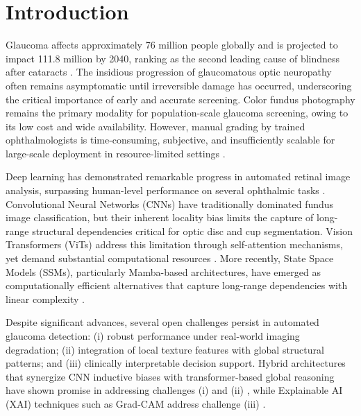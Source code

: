 \documentclass[conference]{IEEEtran}
\begin{document}
\section{Introduction}

Glaucoma affects approximately 76 million people globally and 
is projected to impact 111.8 million by 2040, ranking as the 
second leading cause of blindness after cataracts \cite{b1}. 
The insidious progression of glaucomatous optic neuropathy 
often remains asymptomatic until irreversible damage has 
occurred, underscoring the critical importance of early and 
accurate screening. Color fundus photography remains the 
primary modality for population-scale glaucoma screening, 
owing to its low cost and wide availability. However, manual 
grading by trained ophthalmologists is time-consuming, 
subjective, and insufficiently scalable for large-scale 
deployment in resource-limited settings \cite{b2}.

Deep learning has demonstrated remarkable progress in 
automated retinal image analysis, surpassing human-level 
performance on several ophthalmic tasks \cite{b3}. 
Convolutional Neural Networks (CNNs) have traditionally 
dominated fundus image classification, but their inherent 
locality bias limits the capture of long-range structural 
dependencies critical for optic disc and cup segmentation. 
Vision Transformers (ViTs) address this limitation through 
self-attention mechanisms, yet demand substantial computational 
resources \cite{b4}. More recently, State Space Models (SSMs), 
particularly Mamba-based architectures, have emerged as 
computationally efficient alternatives that capture 
long-range dependencies with linear complexity \cite{b5}.

Despite significant advances, several open challenges persist 
in automated glaucoma detection: (i) robust performance under 
real-world imaging degradation; (ii) integration of local 
texture features with global structural patterns; and (iii) 
clinically interpretable decision support. Hybrid architectures 
that synergize CNN inductive biases with transformer-based 
global reasoning have shown promise in addressing challenges 
(i) and (ii) \cite{b6}, while Explainable AI (XAI) 
techniques such as Grad-CAM address challenge (iii) \cite{b7}.
\end{document}
